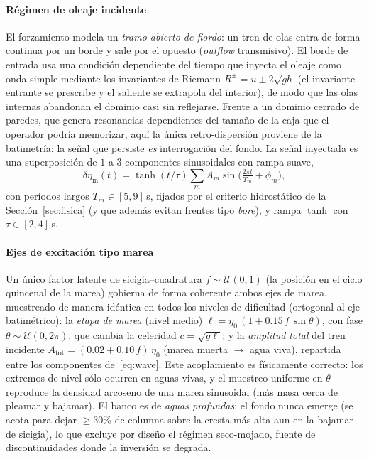\documentclass[conference]{IEEEtran}
\begin{document}
\paragraph{Régimen de oleaje incidente}
El forzamiento modela un \emph{tramo abierto de fiordo}: un tren de olas entra
de forma continua por un borde y sale por el opuesto (\emph{outflow}
transmisivo). El borde de entrada usa una condición dependiente del tiempo que
inyecta el oleaje como onda simple mediante los invariantes de Riemann
$R^\pm = u \pm 2\sqrt{gh}$ (el invariante entrante se prescribe y el saliente se
extrapola del interior), de modo que las olas internas abandonan el dominio casi
sin reflejarse. Frente a un dominio cerrado de paredes, que genera resonancias
dependientes del tamaño de la caja que el operador podría memorizar, aquí la
única retro-dispersión proviene de la batimetría: la señal que persiste
\emph{es} interrogación del fondo. La señal inyectada es una superposición de
$1$ a $3$ componentes sinusoidales con rampa suave,
\begin{equation}
  \delta\eta_{\text{in}}(t) = \tanh(t/\tau)\sum_m A_m
    \sin\!\Big(\tfrac{2\pi t}{T_m}+\phi_m\Big),
  \label{eq:wave}
\end{equation}
con períodos largos $T_m\in[5,9]$\,s, fijados por el criterio hidrostático de
la Sección~\ref{sec:fisica} (y que además evitan frentes tipo \emph{bore}), y
rampa $\tanh$ con $\tau\in[2,4]$\,s.

\paragraph{Ejes de excitación tipo marea}
Un único factor latente de sicigia--cuadratura $f\sim\mathcal{U}(0,1)$ (la
posición en el ciclo quincenal de la marea) gobierna de forma coherente ambos
ejes de marea, muestreado de manera idéntica en todos los niveles de dificultad
(ortogonal al eje batimétrico): la \emph{etapa de marea} (nivel medio)
$\ell = \eta_0\,(1 + 0.15\,f\,\sin\theta)$, con fase $\theta\sim\mathcal{U}(0,2\pi)$,
que cambia la celeridad $c=\sqrt{g\ell}$; y la \emph{amplitud total} del tren
incidente $A_{\text{tot}} = (0.02 + 0.10\,f)\,\eta_0$ (marea muerta $\to$ agua
viva), repartida entre los componentes de~\eqref{eq:wave}. Este acoplamiento es
físicamente correcto: los extremos de nivel sólo ocurren en aguas vivas, y el
muestreo uniforme en $\theta$ reproduce la densidad arcoseno de una marea
sinusoidal (más masa cerca de pleamar y bajamar). El banco es de \emph{aguas
profundas}: el fondo nunca emerge (se acota para dejar $\ge 30\%$ de columna
sobre la cresta más alta aun en la bajamar de sicigia), lo que excluye por
diseño el régimen seco-mojado, fuente de discontinuidades donde la inversión se
degrada.
\end{document}
